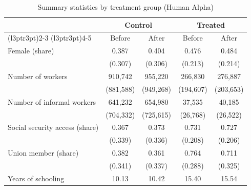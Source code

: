\begin{table}[H]
  \centering
  \caption{\label{tab:sumstats_exposure_alpha_human}Summary statistics by treatment group (Human Alpha)}
  \centering
  \begin{threeparttable}
    \begin{tabular}[t]{lcccc}
      \toprule
      \multicolumn{1}{c}{ }          & \multicolumn{2}{c}{Control} & \multicolumn{2}{c}{Treated}                         \\
      \cmidrule(l{3pt}r{3pt}){2-3} \cmidrule(l{3pt}r{3pt}){4-5}
                                     & Before                      & After                       & Before    & After     \\
      \midrule
      Female (share)                 & 0.387                       & 0.404                       & 0.476     & 0.484     \\
                                     & (0.307)                     & (0.306)                     & (0.213)   & (0.214)   \\
      \addlinespace[3pt]
      Number of workers              & 910,742                     & 955,220                     & 266,830   & 276,887   \\
                                     & (881,588)                   & (949,268)                   & (194,607) & (203,653) \\
      \addlinespace[3pt]
      Number of informal workers     & 641,232                     & 654,980                     & 37,535    & 40,185    \\
                                     & (704,332)                   & (725,615)                   & (26,768)  & (26,522)  \\
      \addlinespace[3pt]
      Social security access (share) & 0.367                       & 0.373                       & 0.731     & 0.727     \\
                                     & (0.339)                     & (0.336)                     & (0.208)   & (0.206)   \\
      \addlinespace[3pt]
      Union member (share)           & 0.382                       & 0.361                       & 0.764     & 0.711     \\
                                     & (0.341)                     & (0.337)                     & (0.288)   & (0.325)   \\
      \addlinespace[3pt]
      Years of schooling             & 10.13                       & 10.42                       & 15.40     & 15.54     \\

\end{tabular}
\end{threeparttable}
\end{table}
